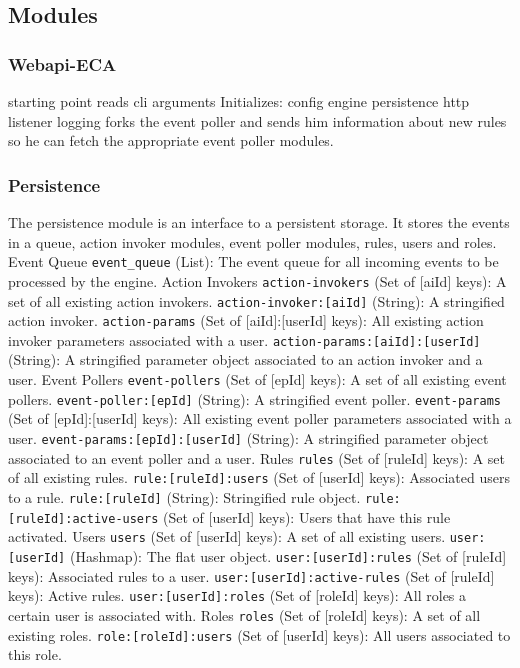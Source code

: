 \documentclass{article}
\begin{document}
\subsection{Modules}
\subsubsection{Webapi-ECA}
starting point
reads cli arguments
Initializes:
config
engine
persistence
http listener
logging
forks the event poller and sends him information about new rules so he can fetch the appropriate event poller modules.

\subsubsection{Persistence}
The persistence module is an interface to a persistent storage.
It stores the events in a queue, action invoker modules, event poller modules, rules, users and roles.
Event Queue
\texttt{event\_queue} (List): The event queue for all incoming events to be processed by the engine.
Action Invokers
\texttt{action-invokers} (Set of [aiId] keys): A set of all existing action invokers.
\texttt{action-invoker:[aiId]} (String): A stringified action invoker.
\texttt{action-params} (Set of [aiId]:[userId] keys): All existing action invoker parameters associated with a user.
\texttt{action-params:[aiId]:[userId]} (String): A stringified parameter object associated to an action invoker and a user.
Event Pollers
\texttt{event-pollers} (Set of [epId] keys): A set of all existing event pollers.
\texttt{event-poller:[epId]} (String): A stringified event poller.
\texttt{event-params} (Set of [epId]:[userId] keys): All existing event poller parameters associated with a user.
\texttt{event-params:[epId]:[userId]} (String): A stringified parameter object associated to an event poller and a user.
Rules
\texttt{rules} (Set of [ruleId] keys): A set of all existing rules.
\texttt{rule:[ruleId]:users} (Set of [userId] keys): Associated users to a rule.
\texttt{rule:[ruleId]} (String): Stringified rule object.
\texttt{rule:[ruleId]:active-users} (Set of [userId] keys): Users that have this rule activated.
Users
\texttt{users} (Set of [userId] keys): A set of all existing users.
\texttt{user:[userId]} (Hashmap): The flat user object.
\texttt{user:[userId]:rules} (Set of [ruleId] keys): Associated rules to a user.
\texttt{user:[userId]:active-rules} (Set of [ruleId] keys): Active rules.
\texttt{user:[userId]:roles} (Set of [roleId] keys): All roles a certain user is associated with.
Roles
\texttt{roles} (Set of [roleId] keys): A set of all existing roles.
\texttt{role:[roleId]:users} (Set of [userId] keys): All users associated to this role.
\end{document}
